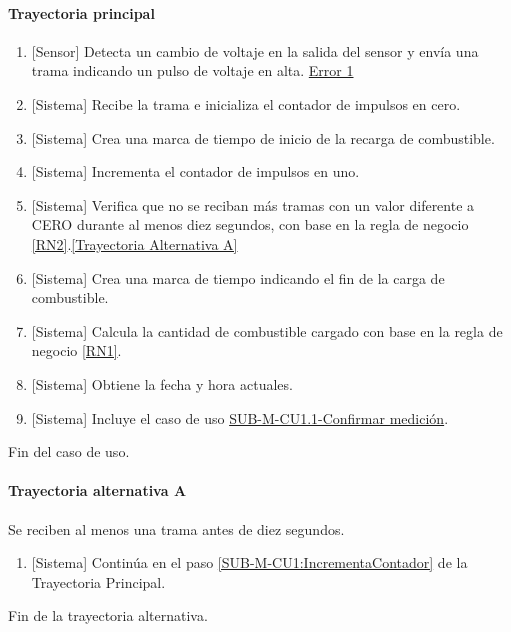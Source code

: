 \paragraph{Trayectoria principal}
	\begin{enumerate}
		\item {[Sensor]} Detecta un cambio de voltaje en la salida del sensor y envía una trama indicando un pulso de voltaje en alta. \hyperref[SUB-M-CU1:Error1]{Error 1}
		\item {[Sistema]} Recibe la trama e inicializa el contador de impulsos en cero.
		\item \label{SUB-M-CU1:MarcaInicio} {[Sistema]} Crea una marca de tiempo de inicio de la recarga de combustible.
		\item \label{SUB-M-CU1:IncrementaContador} {[Sistema]} Incrementa el contador de impulsos en uno.
		\item {[Sistema]} Verifica que no se reciban más tramas con un valor diferente a CERO durante al menos diez segundos, con base en la regla de negocio \ref{RN2}.\hyperref[SUB-M-CU1:TA]{[Trayectoria Alternativa A]}
		\item {[Sistema]} Crea una marca de tiempo indicando el fin de la carga de combustible.
		\item {[Sistema]} Calcula la cantidad de combustible cargado con base en la regla de negocio \ref{RN1}.
		\item {[Sistema]} Obtiene la fecha y hora actuales.
		\item {[Sistema]} Incluye el caso de uso \hyperref[SUB-M-CU1.1]{SUB-M-CU1.1-Confirmar medición}.
	\end{enumerate}
	Fin del caso de uso.

\paragraph{Trayectoria alternativa A} \label{SUB-M-CU1:TA}
	Se reciben al menos una trama antes de diez segundos.
	\begin{enumerate}[label=A\arabic*.]
		\item {[Sistema]} Continúa en el paso \ref{SUB-M-CU1:IncrementaContador} de la Trayectoria Principal.
	\end{enumerate}
	Fin de la trayectoria alternativa.
